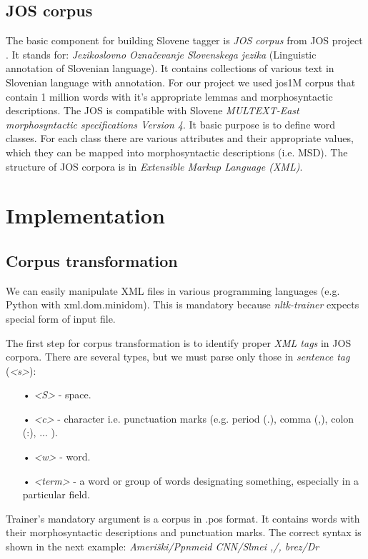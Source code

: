 \documentclass[10pt, conference, compsocconf]{IEEEtran}
\begin{document}
\subsection{JOS corpus} %
The basic component for building Slovene tagger is \textit{JOS corpus} from JOS project \cite{JOS}. It stands for: \textit{Jezikoslovno Označevanje Slovenskega jezika} (Linguistic annotation of Slovenian language).
It contains collections of various text in Slovenian language with annotation.
For our project we used jos1M corpus that contain 1 million words with it's appropriate lemmas and morphosyntactic descriptions.
The JOS is compatible with Slovene\textit{ MULTEXT-East morphosyntactic specifications Version 4}\cite{MULTEXT-East}.
It basic purpose is to define word classes.
For each class there are various attributes and their appropriate values, which they can be mapped into morphosyntactic descriptions (i.e. MSD).
The structure of JOS corpora is in  \textit{Extensible Markup Language (XML)}.

\section{Implementation}
\subsection{Corpus transformation} %
\label{Corpus transformation} 

We can easily manipulate XML files in various programming languages (e.g. Python with xml.dom.minidom).
This is mandatory because \textit{nltk-trainer}\cite{nltk-trainer} expects special form of input file.

The first step for corpus transformation is to identify proper \textit{XML tags}\cite{xml_tags} in JOS corpora. There are several types, but we must parse only those in \textit{sentence tag }(\textit{<s>}):
\begin{itemize}
\item[•]\textit{<S>} - space.
\item[•]\textit{<c>} - character i.e. punctuation marks (e.g. period (.), comma (,), colon (:), ... ).
\item[•]\textit{<w>} - word.
\item[•]\textit{<term>} - a word or group of words designating something, especially in a particular field. 
\end{itemize}

Trainer's mandatory argument is a corpus in .pos format. It contains words with their morphosyntactic descriptions and punctuation marks. The correct syntax is shown in the next example:
\textit{Ameriški/Ppnmeid CNN/Slmei ,/,  brez/Dr }
\end{document}
